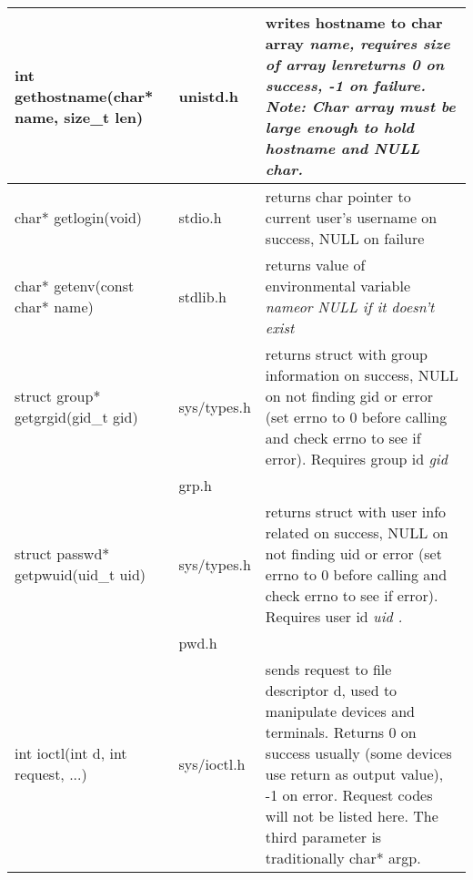 \documentclass{article}
\begin{document}
\begin{longtabu}{l p{1in} p{4in}}
    \\ \hline
    int gethostname(char* name, size\_t len) & unistd.h & writes hostname to char array \it name\rm, requires size of array \it len\rm returns 0 on success, -1 on failure. Note: Char array must be large enough to hold hostname and NULL char.
    \\ \hline
    char* getlogin(void) & stdio.h & returns char pointer to current user's username on success, NULL on failure
    \\ \hline
    char* getenv(const char* name) & stdlib.h & returns value of environmental variable \it name\rm or NULL if it doesn't exist
    \\ \hline
    struct group* getgrgid(gid\_t gid) & sys/types.h & returns struct with group information on success, NULL on not finding gid or error (set errno to 0 before calling and check errno to see if error). Requires group id \it gid\rm
    \\
    &grp.h  &
    \\ \hline
    struct passwd* getpwuid(uid\_t uid) & sys/types.h & returns struct with user info related on success, NULL on not finding uid or error (set errno to 0 before calling and check errno to see if error). Requires user id \it uid \rm .
    \\
    & pwd.h &
    \\ \hline
    int ioctl(int d, int request, ...) & sys/ioctl.h & sends request to file descriptor d, used to manipulate devices and terminals. Returns 0 on success usually (some devices use return as output value), -1 on error. Request codes will not be listed here. The third parameter is traditionally char* argp.
\end{longtabu}

\end{document}
